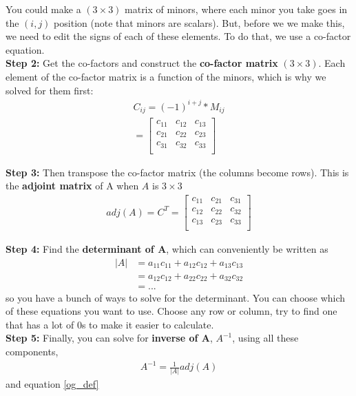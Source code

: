\documentclass{article}
\begin{document}
You could make a $(3 \times 3)$ matrix of minors, where each minor you take goes in the $(i,j)$ position (note that minors are scalars). But, before we we make this, we need to edit the signs of each of these elements. To do that, we use a co-factor equation. \\

\textbf{Step 2:} Get the co-factors and construct the \textbf{co-factor matrix} $(3 \times 3)$. Each element of the co-factor matrix is a function of the minors, which is why we solved for them first: 
\begin{align}
    C_{ij} = (-1)^{i + j} * M_{ij}   \\
    = \begin{bmatrix}
        c_{11} & c_{12} & c_{13}\\
        c_{21} & c_{22} & c_{23}\\
        c_{31} & c_{32} & c_{33}\\
    \end{bmatrix}
\end{align}

\textbf{Step 3:} Then transpose the co-factor matrix (the columns become rows). This is the \textbf{adjoint matrix} of A when $A$ is $3 \times 3$
\begin{align}
    adj(A) = C^T = \begin{bmatrix}
        c_{11} & c_{21} & c_{31}\\
        c_{12} & c_{22} & c_{32}\\
        c_{13} & c_{23} & c_{33}\\
    \end{bmatrix}
\end{align}

\textbf{Step 4:} Find the \textbf{determinant of A}, which can conveniently be written as 
\begin{align}
    |A| &= a_{11}c_{11} + a_{12} c_{12} + a_{13} c_{13}\\
        &= a_{12}c_{12} + a_{22} c_{22} + a_{32} c_{32} \\
        &= ...
\end{align}
so you have a bunch of  ways to solve for the determinant. You can choose which of these equations you want to use. Choose any row or column, try to find one that has a lot of 0s to make it easier to calculate. \\

\textbf{Step 5:} Finally, you can solve for \textbf{inverse of A}, $A^{-1}$,  using all these components, 
\begin{align}
    A^{-1} = \frac{1}{|A|}adj(A)
\end{align}
and equation \ref{og_def}
\end{document}
